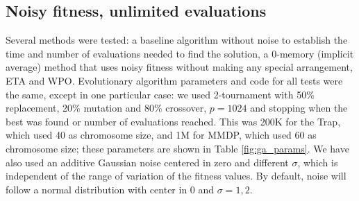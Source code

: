 \documentclass{svmult}
\begin{document}
\subsection{Noisy fitness, unlimited evaluations}
\label{ss:unlimited}

Several methods were tested: a baseline algorithm without
noise to establish the time and number of evaluations
needed to find the solution, a 0-memory (implicit average) method that
uses noisy fitness without making any special arrangement, ETA and
WPO. Evolutionary algorithm parameters and code for all tests were the
same, except in one
particular case: we used 2-tournament with 50\% replacement, 20\%
mutation and 80\% crossover, $p=1024$ and stopping when the best was
found or number of evaluations reached. This was 200K for the Trap,
which used 40 as chromosome size, and 1M for MMDP, which used 60 as
chromosome size; these parameters are shown in Table \ref{fig:ga_params}. We have also used an additive Gaussian noise centered in zero
and different $\sigma$, which is independent of the range of variation
of the fitness values. By default, noise will follow a normal
distribution with center in 0 and $\sigma=1,2$. 
\end{document}
